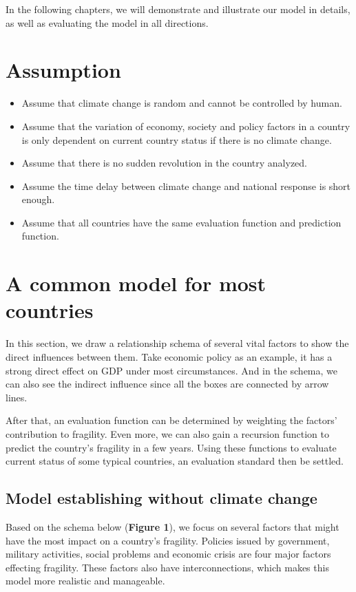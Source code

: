 \documentclass{mcmthesis}
\begin{document}
	In the following chapters, we will demonstrate and illustrate our model in details, as well as evaluating the model in all directions.
	
	\section{Assumption}
	
	\begin{itemize}
		\item Assume that climate change is random and cannot be controlled by human.
		
		\item Assume that the variation of economy, society and policy factors in a country is only dependent on current country status if there is no climate change.
		
		\item Assume that there is no sudden revolution in the country analyzed.
		
		\item Assume the time delay between climate change and national response is short enough.
		
		\item Assume that all countries have the same evaluation function and prediction function.
		
	\end{itemize}
	
	\section{A common model for most countries}
	In this section, we draw a relationship schema of several vital factors to show the direct influences between them. Take economic policy as an example, it has a strong direct effect on GDP under most circumstances. And in the schema, we can also see the indirect influence since all the boxes are connected by arrow lines.
	
	After that, an evaluation function can be determined by weighting the factors’ contribution to fragility. Even more, we can also gain a recursion function to predict the country's fragility in a few years. Using these functions to evaluate current status of some typical countries, an evaluation standard then be settled.
	
	\subsection{Model establishing without climate change}
	Based on the schema below (\textbf{Figure 1}), we focus on several factors that might have the most impact on a country's fragility. Policies issued by government, military activities, social problems and economic crisis are four major factors effecting fragility. These factors also have interconnections, which makes this model more realistic and manageable.
	
\end{document}
